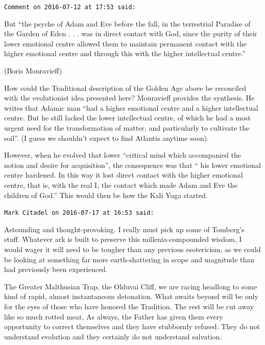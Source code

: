 \begin{footnotesize}
\begin{sffamily}
\texttt{Comment on 2016-07-12 at 17:53 said:}

But ``the psyche of Adam and Eve before the fall, in the terrestrial Paradise of the Garden of Eden . . . was in direct contact with God, since the purity of their lower emotional centre allowed them to maintain permanent contact with the higher emotional centre and through this with the higher intellectual centre.''

(Boris Mouravieff)

How could the Traditional description of the Golden Age above be reconciled with the evolutionist idea presented here? Mouravieff provides the synthesis. He writes that Adamic man ``had a higher emotional centre and a higher intellectual centre. But he still lacked the lower intellectual centre, of which he had a most urgent need for the transformation of matter, and particularly to cultivate the soil''. (I guess we shouldn't expect to find Atlantis anytime soon).

However, when he evolved that lower ``critical mind which accompanied the notion and desire for acquisition'', the consequence was that `` his lower emotional centre hardened. In this way it lost direct contact with the higher emotional centre, that is, with the real I, the contact which made Adam and Eve the children of God.'' This would then be how the Kali Yuga started.

\hfill

\texttt{Mark Citadel on 2016-07-17 at 16:53 said:}

Astounding and thought-provoking. I really must pick up some of Tomberg's stuff. Whatever ark is built to preserve this millenia-compounded wisdom, I would wager it will need to be tougher than any previous esotericism, as we could be looking at something far more earth-shattering in scope and magnitude than had previously been experienced.

The Greater Malthusian Trap, the Olduvai Cliff, we are racing headlong to some kind of rapid, almost instantaneous detonation. What awaits beyond will be only for the eyes of those who have honored the Tradition. The rest will be cut away like so much rotted meat, As always, the Father has given them every opportunity to correct themselves and they have stubbornly refused. They do not understand evolution and they certainly do not understand salvation.


\hfill

\end{sffamily}
\end{footnotesize}

